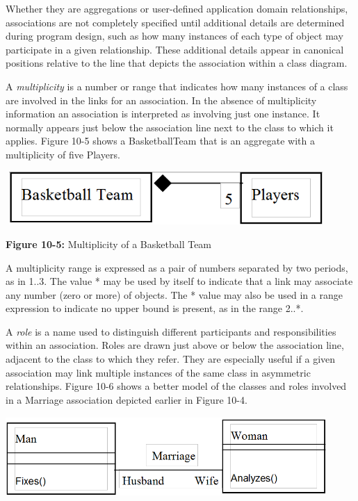Whether they are aggregations or user-defined application domain
relationships, associations are not completely specified until
additional details are determined during program design, such as how
many instances of each type of object may participate in a given
relationship. These additional details appear in canonical positions
relative to the line that depicts the association within a class
diagram.

A \textit{multiplicity} is a number or range that
indicates how many instances of a class are involved in the links for
an association. In the absence of multiplicity information an
association is interpreted as involving just one instance. It normally
appears just below the association line next to the class to which it
applies. Figure 10-5 shows a BasketballTeam that is an aggregate with a
multiplicity of five Players.

\bigskip

\includegraphics[width=4.8in,height=0.8in]{ub-img/multipcy.png}

{\sffamily\bfseries Figure 10-5:}
{\sffamily Multiplicity of a Basketball Team}

\bigskip

A multiplicity range is expressed as a pair of numbers separated by two
periods, as in 1..3. The value * may be used by itself to indicate that
a link may associate any number (zero or more) of objects. The * value
may also be used in a range expression to indicate no upper bound is
present, as in the range 2..*.

A \textit{role} is a name used to distinguish different
participants and responsibilities within an association. Roles are
drawn just above or below the association line, adjacent to the class
to which they refer. They are especially useful if a given association
may link multiple instances of the same class in asymmetric
relationships. Figure 10-6 shows a better model of the classes and
roles involved in a Marriage association depicted earlier in Figure
10-4.

\bigskip

\includegraphics[width=4.8in,height=1.2in]{ub-img/roles.png}


